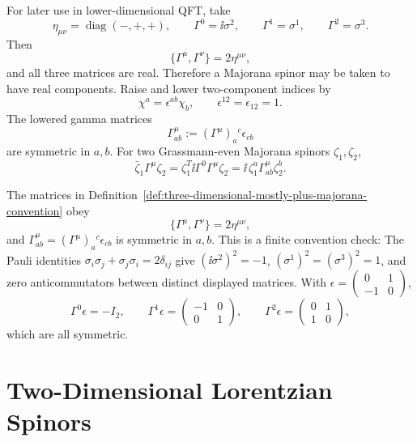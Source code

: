 \begin{definition}
\label{def:three-dimensional-mostly-plus-majorana-convention}
For later use in lower-dimensional QFT, take
\[
  \eta_{\mu\nu}=\operatorname{diag}(-,+,+),
  \qquad
  \Gamma^0=\ii\sigma^2,
  \qquad
  \Gamma^1=\sigma^1,
  \qquad
  \Gamma^2=\sigma^3 .
\]
Then
\[
  \{\Gamma^\mu,\Gamma^\nu\}=2\eta^{\mu\nu},
\]
and all three matrices are real.  Therefore a Majorana spinor may be taken
to have real components.  Raise and lower two-component indices by
\[
  \chi^a=\epsilon^{ab}\chi_b,
  \qquad
  \epsilon^{12}=\epsilon_{12}=1 .
\]
The lowered gamma matrices
\[
  \Gamma^\mu_{ab}:=(\Gamma^\mu)_a{}^c\epsilon_{cb}
\]
are symmetric in \(a,b\).  For two Grassmann-even Majorana spinors
\(\zeta_1,\zeta_2\),
\[
  \bar\zeta_1\Gamma^\mu\zeta_2
  =
  \zeta_1^T\ii\Gamma^0\Gamma^\mu\zeta_2
  =
  \ii\,\zeta_1^a\Gamma^\mu_{ab}\zeta_2^b .
\]
\end{definition}

\begin{remark}
\label{rem:three-dimensional-clifford-symmetric-block-identities}
The matrices in
Definition~\ref{def:three-dimensional-mostly-plus-majorana-convention} obey
\[
  \{\Gamma^\mu,\Gamma^\nu\}=2\eta^{\mu\nu},
\]
and \(\Gamma^\mu_{ab}=(\Gamma^\mu)_a{}^c\epsilon_{cb}\) is symmetric in
\(a,b\).  This is a finite convention check:
The Pauli identities
\(\sigma_i\sigma_j+\sigma_j\sigma_i=2\delta_{ij}\) give
\((\ii\sigma^2)^2=-1\), \((\sigma^1)^2=(\sigma^3)^2=1\), and zero
anticommutators between distinct displayed matrices.  With
\(\epsilon=\begin{pmatrix}0&1\\-1&0\end{pmatrix}\),
\[
  \Gamma^0\epsilon=-I_2,\qquad
  \Gamma^1\epsilon=\begin{pmatrix}-1&0\\0&1\end{pmatrix},
  \qquad
  \Gamma^2\epsilon=\begin{pmatrix}0&1\\1&0\end{pmatrix},
\]
which are all symmetric.
\end{remark}

\section{Two-Dimensional Lorentzian Spinors}

